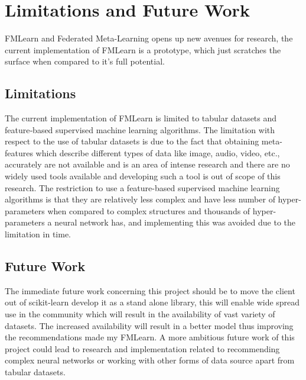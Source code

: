 \chapter{Limitations and Future Work}

FMLearn and Federated Meta-Learning opens up new avenues for research, the current implementation of FMLearn is a prototype, which just scratches the surface when compared to it's full potential.

\section*{Limitations}

The current implementation of FMLearn is limited to tabular datasets and feature‐based supervised machine learning algorithms. The limitation with respect to the use of tabular datasets is due to the fact that obtaining meta-features which describe different types of data like image, audio, video, etc., accurately are not available and is an area of intense research \citep{image-meta-data} \citep{image-meta-data-2} and there are no widely used tools available and developing such a tool is out of scope of this research. The restriction to use a feature-based supervised machine learning algorithms is that they are relatively less complex and have less number of hyper-parameters when compared to complex structures and thousands of hyper-parameters a neural network has, and implementing this was avoided due to the limitation in time.

\section*{Future Work}

The immediate future work concerning this project should be to move the client out of scikit-learn develop it as a stand alone library, this will enable wide spread use in the community which will result in the availability of vast variety of datasets. The increased availability will result in a better model thus improving the recommendations made my FMLearn. A more ambitious future work of this project could lead to research and implementation related to recommending complex neural networks or working with other forms of data source apart from tabular datasets.